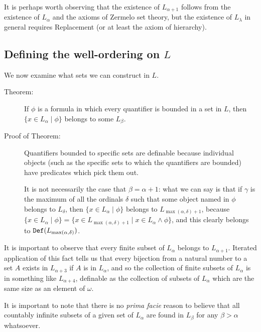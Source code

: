 \documentclass[12pt]{book}
\begin{document}
It is perhaps worth observing that the existence of $L_{\alpha+1}$ follows from the existence of $L_{\alpha}$ and the axioms of Zermelo set theory, but the existence of $L_{\lambda}$ in general requires Replacement (or at least the axiom of hierarchy).

\newpage

\subsection{Defining the well-ordering on $L$}

We now examine what sets we can construct in $L$.

\begin{description}

\item[Theorem:]  If $\phi$ is a formula in which every quantifier is bounded in a set in $L$, then $\{x \in L_{\alpha} \mid \phi\}$ belongs to some $L_{\beta}$.  

\item[Proof of Theorem:]   Quantifiers bounded to specific sets are definable because individual objects (such as the specific sets to which the quantifiers are bounded) have predicates which pick them out.

It is not necessarily the case that $\beta=\alpha+1$:  what we can say is that if $\gamma$ is the maximum of all the ordinals $\delta$ such that some object named in $\phi$ belongs to $L_{\delta}$, then $\{x \in L_{\alpha} \mid \phi\}$ belongs to $L_{\max(\alpha,\delta)+1}$,
because $\{x \in L_{\alpha} \mid \phi\} = \{x \in L_{\max(\alpha,\delta)+1} \mid x \in L_{\alpha} \wedge \phi\}$, and this clearly belongs to 
${\tt Def}(L_{\max(\alpha,\delta)})$.

\end{description}

It is important to observe that every finite subset of $L_{\alpha}$ belongs to $L_{\alpha+1}$.  Iterated application of this fact tells us that every
bijection from a natural number to a set $A$ exists in $L_{\alpha+3}$ if $A$ is in $L_{\alpha}$, and so the collection of finite subsets of $L_{\alpha}$ is in something like $L_{\alpha+4}$, definable as the collection of subsets of $L_{\alpha}$ which are the same size as an element of $\omega$.

It is important to note that there is no {\em prima facie} reason to believe that all countably infinite subsets of a given set of $L_{\alpha}$ are found in $L_{\beta}$ for
any $\beta>\alpha$ whatsoever.
\end{document}
